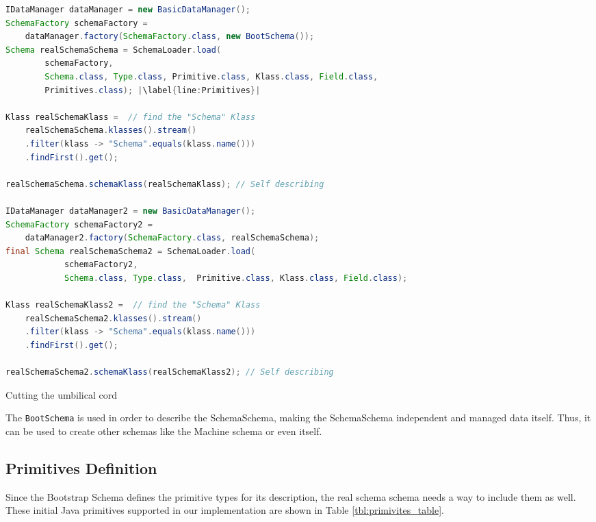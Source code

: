 \begin{sourcecode} [H]
	\begin{lstlisting}[language=Java, escapechar=|]
IDataManager dataManager = new BasicDataManager();
SchemaFactory schemaFactory = 
	dataManager.factory(SchemaFactory.class, new BootSchema());
Schema realSchemaSchema = SchemaLoader.load(
    	schemaFactory,
     	Schema.class, Type.class, Primitive.class, Klass.class, Field.class,
    	Primitives.class); |\label{line:Primitives}|

Klass realSchemaKlass =  // find the "Schema" Klass
	realSchemaSchema.klasses().stream()
	.filter(klass -> "Schema".equals(klass.name()))
	.findFirst().get();

realSchemaSchema.schemaKlass(realSchemaKlass); // Self describing

IDataManager dataManager2 = new BasicDataManager();
SchemaFactory schemaFactory2 = 
	dataManager2.factory(SchemaFactory.class, realSchemaSchema);
final Schema realSchemaSchema2 = SchemaLoader.load(
        	schemaFactory2, 
        	Schema.class, Type.class,  Primitive.class, Klass.class, Field.class);

Klass realSchemaKlass2 =  // find the "Schema" Klass
	realSchemaSchema2.klasses().stream()
	.filter(klass -> "Schema".equals(klass.name()))
	.findFirst().get();

realSchemaSchema2.schemaKlass(realSchemaKlass2); // Self describing
	\end{lstlisting}
	\caption{Cutting the umbilical cord}
	\label{lst:Cutting the umbilical cord}
\end{sourcecode}

The \texttt{BootSchema} is used in order to describe the SchemaSchema, making the SchemaSchema independent and managed data itself.
Thus, it can be used to create other schemas like the Machine schema or even itself.

\subsection{Primitives Definition}\label{Primitives Definition}
Since the Bootstrap Schema defines the primitive types for its description, the real schema schema needs a way to include them as well.
These initial Java primitives supported in our implementation are shown in Table \ref{tbl:primivites_table}.

